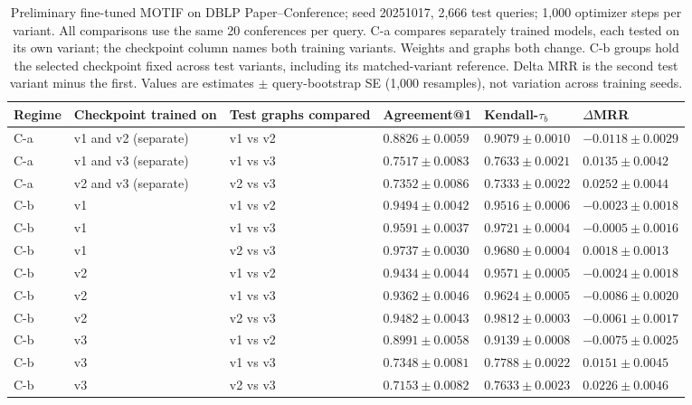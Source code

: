 \begin{table}[htbp]
\centering
\small
\renewcommand{\arraystretch}{1.15}
\setlength{\tabcolsep}{5pt}
\begin{adjustbox}{max width=\linewidth}
\begin{tabular}{|l|l|l|l|l|l|}
\hline
\textbf{Regime} & \textbf{Checkpoint trained on} & \textbf{Test graphs compared} & \textbf{Agreement@1} & \textbf{Kendall-$\tau_b$} & \textbf{$\Delta$MRR} \\
\hline
C-a & v1 and v2 (separate) & v1 vs v2 & $0.8826 \pm 0.0059$ & $0.9079 \pm 0.0010$ & $-0.0118 \pm 0.0029$ \\
\hline
C-a & v1 and v3 (separate) & v1 vs v3 & $0.7517 \pm 0.0083$ & $0.7633 \pm 0.0021$ & $0.0135 \pm 0.0042$ \\
\hline
C-a & v2 and v3 (separate) & v2 vs v3 & $0.7352 \pm 0.0086$ & $0.7333 \pm 0.0022$ & $0.0252 \pm 0.0044$ \\
\hline
C-b & v1 & v1 vs v2 & $0.9494 \pm 0.0042$ & $0.9516 \pm 0.0006$ & $-0.0023 \pm 0.0018$ \\
\hline
C-b & v1 & v1 vs v3 & $0.9591 \pm 0.0037$ & $0.9721 \pm 0.0004$ & $-0.0005 \pm 0.0016$ \\
\hline
C-b & v1 & v2 vs v3 & $0.9737 \pm 0.0030$ & $0.9680 \pm 0.0004$ & $0.0018 \pm 0.0013$ \\
\hline
C-b & v2 & v1 vs v2 & $0.9434 \pm 0.0044$ & $0.9571 \pm 0.0005$ & $-0.0024 \pm 0.0018$ \\
\hline
C-b & v2 & v1 vs v3 & $0.9362 \pm 0.0046$ & $0.9624 \pm 0.0005$ & $-0.0086 \pm 0.0020$ \\
\hline
C-b & v2 & v2 vs v3 & $0.9482 \pm 0.0043$ & $0.9812 \pm 0.0003$ & $-0.0061 \pm 0.0017$ \\
\hline
C-b & v3 & v1 vs v2 & $0.8991 \pm 0.0058$ & $0.9139 \pm 0.0008$ & $-0.0075 \pm 0.0025$ \\
\hline
C-b & v3 & v1 vs v3 & $0.7348 \pm 0.0081$ & $0.7788 \pm 0.0022$ & $0.0151 \pm 0.0045$ \\
\hline
C-b & v3 & v2 vs v3 & $0.7153 \pm 0.0082$ & $0.7633 \pm 0.0023$ & $0.0226 \pm 0.0046$ \\
\hline
\end{tabular}
\end{adjustbox}
\caption{Preliminary fine-tuned MOTIF on DBLP Paper--Conference; seed 20251017, 2,666 test queries; 1,000 optimizer steps per variant. All comparisons use the same 20 conferences per query. C-a compares separately trained models, each tested on its own variant; the checkpoint column names both training variants. Weights and graphs both change. C-b groups hold the selected checkpoint fixed across test variants, including its matched-variant reference. Delta MRR is the second test variant minus the first. Values are estimates $\pm$ query-bootstrap SE (1,000 resamples), not variation across training seeds.}
\label{tab:motif-dblp-matrix-invariance}
\end{table}
